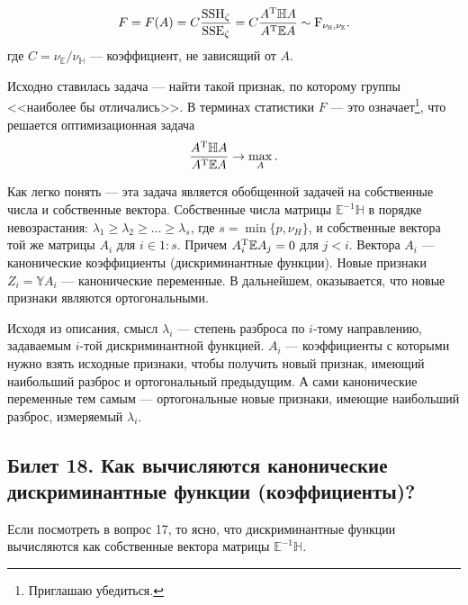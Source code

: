 \begin{gather*}
    F = F(A) = C \frac{\mathrm{SSH}_\zeta}{\mathrm{SSE_\zeta}} = C \frac{A^{\mathrm{T}} \mathbb H A}{A^{\mathrm{T}} \mathbb E A} \sim
    \mathrm F_{\nu_\mathbb H, \nu_\mathbb E}.
\end{gather*}
где $C = \nu_\mathbb E / \nu_\mathbb H$ --- коэффициент, не зависящий от $A$.

Исходно ставилась задача --- найти такой признак, по которому группы <<наиболее бы отличались>>.
В терминах статистики $F$ --- это означает\footnote{Приглашаю убедиться.}, что решается оптимизационная задача
\begin{gather*}
    \frac{A^{\mathrm{T}} \mathbb H A}{A^{\mathrm{T}} \mathbb E A} \rightarrow \max_A.
\end{gather*}

Как легко понять --- эта задача является обобщенной задачей на собственные числа и собственные вектора.
Собственные числа матрицы $\mathbb E^{-1} \mathbb H$ в порядке невозрастания: $\lambda_1 \geqslant \lambda_2 \geqslant \ldots
\geqslant \lambda_s$, где $s = \min\{p, \nu_H\}$, и собственные вектора той же матрицы $A_i$ для $i \in 1:s$.
Причем $A_i^{\mathrm{T}} \mathbb E A_j = 0$ для $j < i$.
Вектора $A_i$ --- канонические коэффициенты (дискриминантные функции). Новые признаки $Z_i = \mathbb Y A_i$ --- канонические переменные.
В дальнейшем, оказывается, что новые признаки являются ортогональными.

Исходя из описания, смысл $\lambda_i$ --- степень разброса по $i$-тому направлению, задаваемым $i$-той дискриминантной функцией.
$A_i$ --- коэффициенты с которыми нужно взять исходные признаки, чтобы получить новый признак, имеющий наибольший разброс и ортогональный
предыдущим. А сами канонические переменные тем самым --- ортогональные новые признаки, имеющие наибольший разброс, измеряемый $\lambda_i$.

\subsection{Билет 18. Как вычисляются канонические дискриминантные функции (коэффициенты)?}

Если посмотреть в вопрос 17, то ясно, что дискриминантные функции вычисляются как собственные вектора матрицы $\mathbb E^{-1} \mathbb H$.
